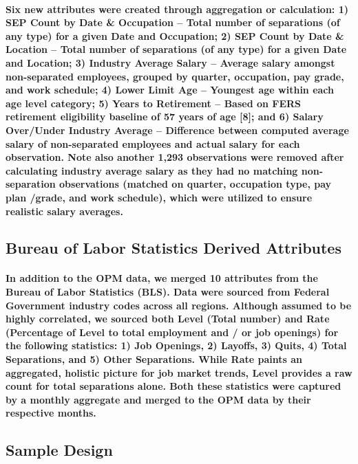 \documentclass{article}
\begin{document}
\paragraph{Six new attributes were created through aggregation or calculation: 1) SEP Count by Date \& Occupation – Total number of separations (of any type) for a given Date and Occupation; 2) SEP Count by Date \& Location – Total number of separations (of any type) for a given Date and Location; 3) Industry Average Salary – Average salary amongst non-separated employees, grouped by quarter, occupation, pay grade, and work schedule; 4) Lower Limit Age – Youngest age within each age level category; 5) Years to Retirement – Based on FERS retirement eligibility baseline of 57 years of age [8]; and 6) Salary Over/Under Industry Average – Difference between computed average salary of non-separated employees and actual salary for each observation. Note also another 1,293 observations were removed after calculating industry average salary as they had no matching non-separation observations (matched on quarter, occupation type, pay plan /grade, and work schedule), which were utilized to ensure realistic salary averages.}
 
\subsection{Bureau of Labor Statistics Derived Attributes}

\paragraph{In addition to the OPM data, we merged 10 attributes from the Bureau of Labor Statistics (BLS). Data were sourced from Federal Government industry codes across all regions. Although assumed to be highly correlated, we sourced both Level (Total number) and Rate (Percentage of Level to total employment and / or job openings) for the following statistics: 1) Job Openings, 2) Layoffs, 3) Quits, 4) Total Separations, and 5) Other Separations. While Rate paints an aggregated, holistic picture for job market trends, Level provides a raw count for total separations alone. Both these statistics were captured by a monthly aggregate and merged to the OPM data by their respective months.}
 
\subsection{Sample Design}
\end{document}
